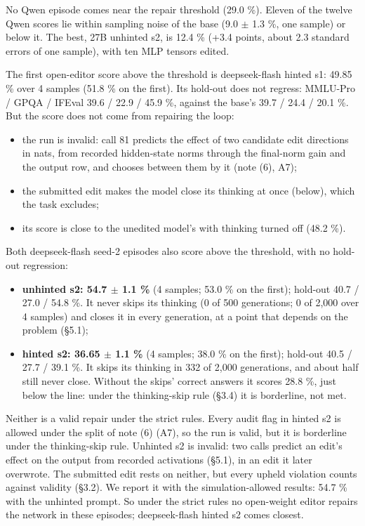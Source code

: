 \documentclass[
  10pt,
]{article}
\providecommand{\tightlist}{%
  \setlength{\itemsep}{0pt}\setlength{\parskip}{0pt}}
\begin{document}
No Qwen episode comes near the repair threshold (29.0 \%). Eleven of the
twelve Qwen scores lie within sampling noise of the base (9.0 \ensuremath{\pm} 1.3 \%,
one sample) or below it. The best, 27B unhinted s2, is 12.4 \% (+3.4
points, about 2.3 standard errors of one sample), with ten MLP tensors
edited.

The first open-editor score above the threshold is deepseek-flash hinted
s1: 49.85 \% over 4 samples (51.8 \% on the first). Its hold-out does
not regress: MMLU-Pro / GPQA / IFEval 39.6 / 22.9 / 45.9 \%, against the
base's 39.7 / 24.4 / 20.1 \%. But the score does not come from repairing
the loop:

\begin{itemize}
\tightlist
\item
  the run is invalid: call 81 predicts the effect of two candidate edit
  directions in nats, from recorded hidden-state norms through the
  final-norm gain and the output row, and chooses between them by it
  (note (6), A7);
\item
  the submitted edit makes the model close its thinking at once (below),
  which the task excludes;
\item
  its score is close to the unedited model's with thinking turned off
  (48.2 \%).
\end{itemize}

Both deepseek-flash seed-2 episodes also score above the threshold, with
no hold-out regression:

\begin{itemize}
\tightlist
\item
  \textbf{unhinted s2: 54.7 \ensuremath{\pm} 1.1 \%} (4 samples; 53.0 \% on the first);
  hold-out 40.7 / 27.0 / 54.8 \%. It never skips its thinking (0 of 500
  generations; 0 of 2,000 over 4 samples) and closes it in every
  generation, at a point that depends on the problem (\S{}5.1);
\item
  \textbf{hinted s2: 36.65 \ensuremath{\pm} 1.1 \%} (4 samples; 38.0 \% on the first);
  hold-out 40.5 / 27.7 / 39.1 \%. It skips its thinking in 332 of 2,000
  generations, and about half still never close. Without the skips'
  correct answers it scores 28.8 \%, just below the line: under the
  thinking-skip rule (\S{}3.4) it is borderline, not met.
\end{itemize}

Neither is a valid repair under the strict rules. Every audit flag in
hinted s2 is allowed under the split of note (6) (A7), so the run is
valid, but it is borderline under the thinking-skip rule. Unhinted s2 is
invalid: two calls predict an edit's effect on the output from recorded
activations (\S{}5.1), in an edit it later overwrote. The submitted edit
rests on neither, but every upheld violation counts against validity
(\S{}3.2). We report it with the simulation-allowed results: 54.7 \% with
the unhinted prompt. So under the strict rules no open-weight editor
repairs the network in these episodes; deepseek-flash hinted s2 comes
closest.
\end{document}
